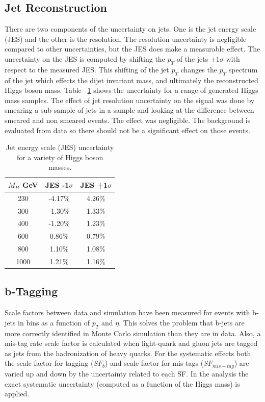 \subsection{Jet Reconstruction}
\label{JESsystematics}

There are two components of the uncertainty on jets.  One is the jet energy scale (JES) and the other is the resolution.  The resolution uncertainty is negligible compared to other uncertainties, but the JES does make a measurable effect.  The uncertainty on the JES is computed by shifting the $p_T$ of the jets $\pm 1 \sigma$ with respect to the measured JES.  This shifting of the jet $p_T$ changes the $p_T$ spectrum of the jet which effects the dijet invariant mass, and ultimately the reconstructed Higgs boson mass.  Table ~\ref{tab:JES} shows the uncertainty for a range of generated Higgs mass samples. The effect of jet resolution uncertainty on the signal was done by smearing a sub-sample of jets in a sample and looking at the difference between smeared and non smeared events. The effect was negligible.  The background is evaluated from data so there should not be a significant effect on those events.


\begin{table}[htb]
\caption{%
    Jet energy scale (JES) uncertainty for a variety of Higgs boson masses.
}
\begin{center}

    \begin{tabular}{ | c | c | c |}
      \hline
      $M_H$ GeV & JES -1$\sigma$ & JES +1$\sigma$ \\ \hline \hline
      230  & -4.17\% & 4.26\% \\
      300  & -1.30\% & 1.33\% \\
      400  & -1.20\% & 1.23\% \\ 
      600  & 0.86\%  & 0.79\% \\
      800  & 1.10\%  & 1.08\% \\
      1000 & 1.21\%  & 1.16\% \\ \hline
      
    \end{tabular}
\end{center}
\label{tab:JES}
\end{table}




\subsection{b-Tagging}
Scale factors between data and simulation have been measured for events with b-jets in bins as a function of $p_T$ and $\eta$.  This solves the problem that b-jets are more correctly identified in Monte Carlo simulation than they are in data.  Also, a mis-tag rate scale factor is calculated when light-quark and gluon jets are tagged as jets from the hadronization of heavy quarks.  For the systematic effects both the scale factor for tagging ($SF_b$) and scale factor for mis-tags ($SF_{mis-tag}$) are varied up and down by the uncertainty related to each SF. In the analysis the exact systematic uncertainty (computed as a function of the Higgs mass) is applied.


